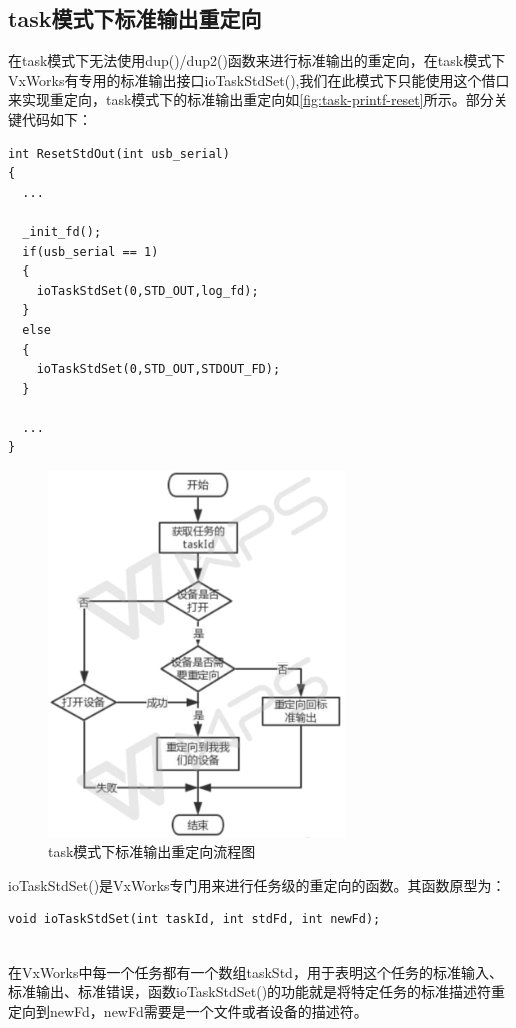 \subsection{task模式下标准输出重定向}
在task模式下无法使用dup()/dup2()函数来进行标准输出的重定向，在task模式下VxWorks有专用的标准输出接口ioTaskStdSet(),我们在此模式下只能使用这个借口来实现重定向，task模式下的标准输出重定向如\autoref{fig:task-printf-reset}所示。部分关键代码如下：
\lstset{language=C}
\begin{lstlisting}
int ResetStdOut(int usb_serial)
{
  ...
	
  _init_fd();
  if(usb_serial == 1)
  {
    ioTaskStdSet(0,STD_OUT,log_fd);
  }
  else
  {
    ioTaskStdSet(0,STD_OUT,STDOUT_FD);
  }
  
  ...
}
\end{lstlisting}

\begin{figure}[!h]
\centering
\includegraphics[width=0.7\textwidth]{./graphics/TASK-STDOUT-RESET.pdf}
\caption{task模式下标准输出重定向流程图}\label{fig:task-printf-reset}
\end{figure}

ioTaskStdSet()是VxWorks专门用来进行任务级的重定向的函数。其函数原型为：
\lstset{language=C}
\begin{lstlisting}
void ioTaskStdSet(int taskId, int stdFd, int newFd);
\end{lstlisting}\\
在VxWorks中每一个任务都有一个数组taskStd，用于表明这个任务的标准输入、标准输出、标准错误，函数ioTaskStdSet()的功能就是将特定任务的标准描述符重定向到newFd，newFd需要是一个文件或者设备的描述符。


